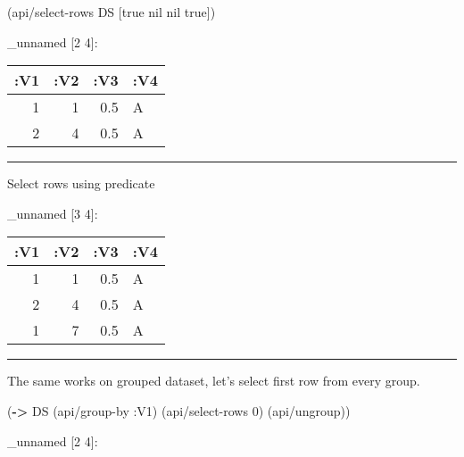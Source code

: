 \documentclass[]{article}
\newenvironment{Shaded}{\begin{snugshade}}{\end{snugshade}}
\newcommand{\KeywordTok}[1]{\textcolor[rgb]{0.13,0.29,0.53}{\textbf{#1}}}
\newcommand{\DecValTok}[1]{\textcolor[rgb]{0.00,0.00,0.81}{#1}}
\newcommand{\VariableTok}[1]{\textcolor[rgb]{0.00,0.00,0.00}{#1}}
\newcommand{\AttributeTok}[1]{\textcolor[rgb]{0.77,0.63,0.00}{#1}}
\newcommand{\NormalTok}[1]{#1}
\begin{document}
\begin{Shaded}
\begin{Highlighting}[]
\NormalTok{(api/select-rows DS [}\VariableTok{true} \VariableTok{nil} \VariableTok{nil} \VariableTok{true}\NormalTok{])}
\end{Highlighting}
\end{Shaded}

\_unnamed {[}2 4{]}:

\begin{longtable}[]{@{}rrrl@{}}
\toprule
:V1 & :V2 & :V3 & :V4\tabularnewline
\midrule
\endhead
1 & 1 & 0.5 & A\tabularnewline
2 & 4 & 0.5 & A\tabularnewline
\bottomrule
\end{longtable}

\begin{center}\rule{0.5\linewidth}{0.5pt}\end{center}

Select rows using predicate

\begin{Shaded}
\end{Shaded}

\_unnamed {[}3 4{]}:

\begin{longtable}[]{@{}rrrl@{}}
\toprule
:V1 & :V2 & :V3 & :V4\tabularnewline
\midrule
\endhead
1 & 1 & 0.5 & A\tabularnewline
2 & 4 & 0.5 & A\tabularnewline
1 & 7 & 0.5 & A\tabularnewline
\bottomrule
\end{longtable}

\begin{center}\rule{0.5\linewidth}{0.5pt}\end{center}

The same works on grouped dataset, let's select first row from every
group.

\begin{Shaded}
\begin{Highlighting}[]
\NormalTok{(}\KeywordTok{->}\NormalTok{ DS}
\NormalTok{    (api/group-by }\AttributeTok{:V1}\NormalTok{)}
\NormalTok{    (api/select-rows }\DecValTok{0}\NormalTok{)}
\NormalTok{    (api/ungroup))}
\end{Highlighting}
\end{Shaded}

\_unnamed {[}2 4{]}:
\end{document}
